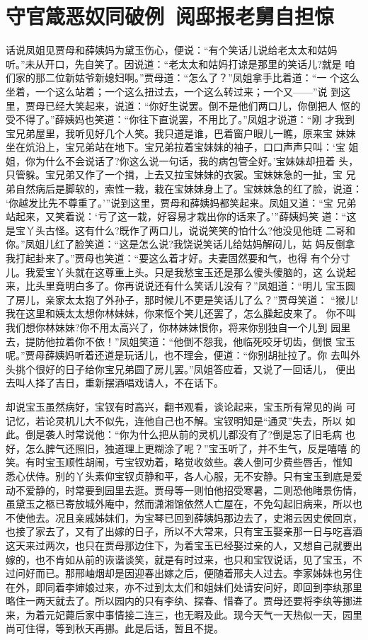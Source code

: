 \chapter{守官箴恶奴同破例~阅邸报老舅自担惊}

话说凤姐见贾母和薛姨妈为黛玉伤心，便说：“有个笑话儿说给老太太和姑妈
听。”未从开口，先自笑了。因说道：“老太太和姑妈打谅是那里的笑话儿?就是
咱们家的那二位新姑爷新媳妇啊。”贾母道：“怎么了？”凤姐拿手比着道：“一
个这么坐着，一个这么站着；一个这么扭过去，一个这么转过来；一个又——”说
到这里，贾母已经大笑起来，说道：“你好生说罢。倒不是他们两口儿，你倒把人
怄的受不得了。”薛姨妈也笑道：“你往下直说罢，不用比了。”凤姐才说道：“刚
才我到宝兄弟屋里，我听见好几个人笑。我只道是谁，巴着窗户眼儿一瞧，原来宝
妹妹坐在炕沿上，宝兄弟站在地下。宝兄弟拉着宝妹妹的袖子，口口声声只叫：‘宝
姐姐，你为什么不会说话了?你这么说一句话，我的病包管全好。’宝妹妹却扭着
头，只管躲。宝兄弟又作了一个揖，上去又拉宝妹妹的衣裳。宝妹妹急的一扯，宝
兄弟自然病后是脚软的，索性一栽，栽在宝妹妹身上了。宝妹妹急的红了脸，说道：
‘你越发比先不尊重了。’”说到这里，贾母和薛姨妈都笑起来。凤姐又道：“宝
兄弟站起来，又笑着说：‘亏了这一栽，好容易才栽出你的话来了。’”薛姨妈笑
道：“这是宝丫头古怪。这有什么?既作了两口儿，说说笑笑的怕什么?他没见他琏
二哥和你。”凤姐儿红了脸笑道：“这是怎么说?我饶说笑话儿给姑妈解闷儿，姑
妈反倒拿我打起卦来了。”贾母也笑道：“要这么着才好。夫妻固然要和气，也得
有个分寸儿。我爱宝丫头就在这尊重上头。只是我愁宝玉还是那么傻头傻脑的，这
么说起来，比头里竟明白多了。你再说说还有什么笑话儿没有？”凤姐道：“明儿
宝玉圆了房儿，亲家太太抱了外孙子，那时候儿不更是笑话儿了么？”贾母笑道：
“猴儿!我在这里和姨太太想你林妹妹，你来怄个笑儿还罢了，怎么臊起皮来了。
你不叫我们想你林妹妹?你不用太高兴了，你林妹妹恨你，将来你别独自一个儿到
园里去，提防他拉着你不依！”凤姐笑道：“他倒不怨我，他临死咬牙切齿，倒恨
宝玉呢。”贾母薛姨妈听着还道是玩话儿，也不理会，便道：“你别胡扯拉了。你
去叫外头挑个很好的日子给你宝兄弟圆了房儿罢。”凤姐答应着，又说了一回话儿，
便出去叫人择了吉日，重新摆酒唱戏请人，不在话下。

却说宝玉虽然病好，宝钗有时高兴，翻书观看，谈论起来，宝玉所有常见的尚
可记忆，若论灵机儿大不似先，连他自己也不解。宝钗明知是“通灵”失去，所以
如此。倒是袭人时常说他：“你为什么把从前的灵机儿都没有了?倒是忘了旧毛病
也好，怎么脾气还照旧，独道理上更糊涂了呢？”宝玉听了，并不生气，反是嘻嘻
的笑。有时宝玉顺性胡闹，亏宝钗劝着，略觉收敛些。袭人倒可少费些唇舌，惟知
悉心伏侍。别的丫头素仰宝钗贞静和平，各人心服，无不安静。只有宝玉到底是爱
动不爱静的，时常要到园里去逛。贾母等一则怕他招受寒暑，二则恐他睹景伤情，
虽黛玉之柩已寄放城外庵中，然而潇湘馆依然人亡屋在，不免勾起旧病来，所以也
不使他去。况且亲戚姊妹们，为宝琴已回到薛姨妈那边去了，史湘云因史侯回京，
也接了家去了，又有了出嫁的日子，所以不大常来，只有宝玉娶亲那一日与吃喜酒
这天来过两次，也只在贾母那边住下，为着宝玉已经娶过亲的人，又想自己就要出
嫁的，也不肯如从前的诙谐谈笑，就是有时过来，也只和宝钗说话，见了宝玉，不
过问好而已。那邢岫烟却是因迎春出嫁之后，便随着邢夫人过去。李家姊妹也另住
在外，即同着李婶娘过来，亦不过到太太们和姐妹们处请安问好，即回到李纨那里
略住一两天就去了。所以园内的只有李纨、探春、惜春了。贾母还要将李纨等挪进
来，为着元妃薨后家中事情接二连三，也无暇及此。现今天气一天热似一天，园里
尚可住得，等到秋天再挪。此是后话，暂且不提。

